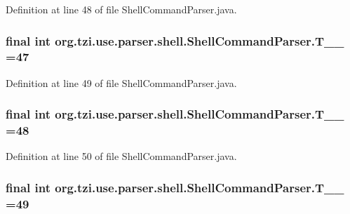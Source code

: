 Definition at line 48 of file Shell\-Command\-Parser.\-java.

\hypertarget{classorg_1_1tzi_1_1use_1_1parser_1_1shell_1_1_shell_command_parser_a6f50986cde5fc1efc3831f43f1f8a063}{
\subsubsection[{T\-\_\-\-\_\-47}]{\setlength{\rightskip}{0pt plus 5cm}final int org.\-tzi.\-use.\-parser.\-shell.\-Shell\-Command\-Parser.\-T\-\_\-\-\_ =47\hspace{0.3cm}{\ttfamily [static]}}}\label{classorg_1_1tzi_1_1use_1_1parser_1_1shell_1_1_shell_command_parser_a6f50986cde5fc1efc3831f43f1f8a063}


Definition at line 49 of file Shell\-Command\-Parser.\-java.

\hypertarget{classorg_1_1tzi_1_1use_1_1parser_1_1shell_1_1_shell_command_parser_a9ca73018c51d76fc6eacfdec4527d91a}{
\subsubsection[{T\-\_\-\-\_\-48}]{\setlength{\rightskip}{0pt plus 5cm}final int org.\-tzi.\-use.\-parser.\-shell.\-Shell\-Command\-Parser.\-T\-\_\-\-\_ =48\hspace{0.3cm}{\ttfamily [static]}}}\label{classorg_1_1tzi_1_1use_1_1parser_1_1shell_1_1_shell_command_parser_a9ca73018c51d76fc6eacfdec4527d91a}


Definition at line 50 of file Shell\-Command\-Parser.\-java.

\hypertarget{classorg_1_1tzi_1_1use_1_1parser_1_1shell_1_1_shell_command_parser_a671f9238d5f37a2c2b80be36c274d2fb}{
\subsubsection[{T\-\_\-\-\_\-49}]{\setlength{\rightskip}{0pt plus 5cm}final int org.\-tzi.\-use.\-parser.\-shell.\-Shell\-Command\-Parser.\-T\-\_\-\-\_ =49\hspace{0.3cm}{\ttfamily [static]}}}\label{classorg_1_1tzi_1_1use_1_1parser_1_1shell_1_1_shell_command_parser_a671f9238d5f37a2c2b80be36c274d2fb}


